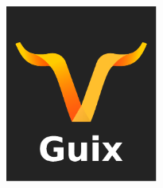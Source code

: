 \documentclass[bigger]{beamer}
\begin{document}
\begin{frame}[label={sec:org3ff50cd}]{⁤}
\begin{center}
\includegraphics[height=220]{./Guix Logo.pdf}
\end{center}
\end{frame}
\end{document}
